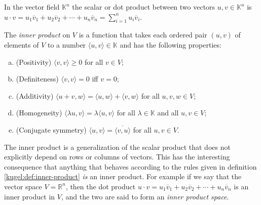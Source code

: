 \begin{definition}
  \label{kugel:def:dot-product}
  In the vector field \(\mathbb{K}^n\) the scalar or dot product between two
  vectors \(u, v \in \mathbb{K}^n\) is
  \(
    u \cdot v 
    = u_1 \overline{v}_1 + u_2 \overline{v}_2 + \cdots + u_n \overline{v}_n
    = \sum_{i=1}^n u_i \overline{v}_i.
  \)
\end{definition}


\begin{definition}[Span]
\end{definition}


\begin{definition}
\end{definition}



\begin{definition}[Basis]
\end{definition}

\fi

\begin{definition}
  \label{kugel:def:inner-product} \nocite{axler_linear_2014}
  The \emph{inner product} on \(V\) is a function that takes each ordered pair
  \((u, v)\) of elements of \(V\) to a number \(\langle u, v \rangle \in
  \mathbb{K}\) and has the following properties:
  \begin{enumerate}[(a)]
    \item (Positivity) \(\langle v, v \rangle \geq 0\) for all \(v \in V\);
    \item (Definiteness) \(\langle v, v \rangle = 0\) iff \(v = 0\);
    \item (Additivity) \(
        \langle u + v, w \rangle =
        \langle u, w \rangle + \langle v, w \rangle
      \) for all \(u, v, w \in V\);
    \item (Homogeneity) \(
        \langle \lambda u, v \rangle =
        \lambda \langle u, v \rangle
      \) for all \(\lambda \in \mathbb{K}\) and all \(u, v \in V\);
    \item (Conjugate symmetry)
      \(\langle u, v \rangle = \overline{\langle v, u \rangle}\) for all
      \(u, v \in V\).
  \end{enumerate}
\end{definition}

The inner product is a generalization of the scalar product that does not
explicitly depend on rows or columns of vectors. This has the interesting
consequence that anything that behaves according to the rules given in
definition \ref{kugel:def:inner-product} \emph{is} an inner product. For
example if we say that the vector space \(V = \mathbb{R}^n\), then the dot
product
\(
  u \cdot v = u_1 \overline{v}_1
    + u_2 \overline{v}_2
    + \cdots + u_n \overline{v}_n
\)
is an inner product in \(V\), and the two are said to form an \emph{inner
product space}.


